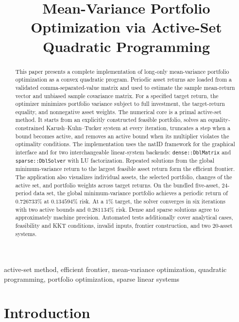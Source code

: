 \documentclass[conference]{IEEEtran}
\title{Mean-Variance Portfolio Optimization via Active-Set Quadratic Programming}
\author{%
\IEEEauthorblockN{Tarik Agi\'{c}}
\IEEEauthorblockA{Student ID: 20108\\
Numerical Optimization Course Project}
}
\begin{document}
\maketitle

\begin{abstract}
This paper presents a complete implementation of long-only mean-variance
portfolio optimization as a convex quadratic program. Periodic asset returns
are loaded from a validated comma-separated-value matrix and used to estimate
the sample mean-return vector and unbiased sample covariance matrix. For a
specified target return, the optimizer minimizes portfolio variance subject to
full investment, the target-return equality, and nonnegative asset weights.
The numerical core is a primal active-set method. It starts from an explicitly
constructed feasible portfolio, solves an equality-constrained
Karush--Kuhn--Tucker system at every iteration, truncates a step when a bound
becomes active, and removes an active bound when its multiplier violates the
optimality conditions. The implementation uses the natID framework for the
graphical interface and for two interchangeable linear-system backends:
\texttt{dense::DblMatrix} and \texttt{sparse::DblSolver} with LU
factorization. Repeated solutions from the global minimum-variance return to
the largest feasible asset return form the efficient frontier. The application
also visualizes individual assets, the selected portfolio, changes of the
active set, and portfolio weights across target returns. On the bundled
five-asset, 24-period data set, the global minimum-variance portfolio achieves
a periodic return of $0.726733\%$ at $0.134594\%$ risk. At a $1\%$ target, the
solver converges in six iterations with two active bounds and $0.281134\%$
risk. Dense and sparse solutions agree to approximately machine precision.
Automated tests additionally cover analytical cases, feasibility and KKT
conditions, invalid inputs, frontier construction, and two 20-asset systems.
\end{abstract}

\begin{IEEEkeywords}
active-set method, efficient frontier, mean-variance optimization, quadratic
programming, portfolio optimization, sparse linear systems
\end{IEEEkeywords}

\section{Introduction}
\end{document}
